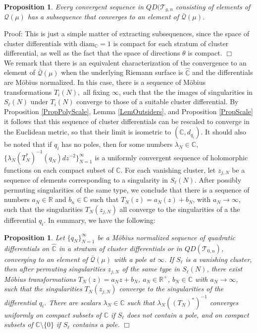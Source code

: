 \documentclass[12pt]{article}
\newtheorem{proposition}[theorem]{Proposition}
\newcommand{\rr}{\mathbb{R}}
\newcommand{\cc}{\mathbb{C}}
\newcommand{\diam}{\mathrm{diam}}
\begin{document}
\begin{proposition} Every convergent sequence in $QD(\mathcal{T}_{g,n}$ consisting of elements of $\mathcal{Q}(\mu)$ has a subsequence that converges to an element of $\bar{\mathcal{Q}}(\mu)$.\end{proposition}

\noindent Proof: This is just a simple matter of extracting subsequences, since the space of cluster differentials with $\diam_\cc = 1$ is compact for each stratum of cluster differential, as well as the fact that the space of directions $\theta$ is compact. $\Box$\\

\noindent We remark that there is an equivalent characterization of the convergence to an element of $\bar{\mathcal{Q}}(\mu)$ when the underlying Riemann surface is $\hat{\cc}$ and the differentials are M\"obius normalized. In this case, there is a sequence of M\"obius transformations $T_i(N),$ all fixing $\infty$, such that the the images of singularities in $S_\ell(N)$ under $T_i(N)$ converge to those of a suitable cluster differential. By Proposition \ref{PropPolyScale}, Lemma \ref{LemOutsiders}, and Proposition \ref{PropScale} it follows that this sequence of cluster differentials can be rescaled to converge in the Euclidean metric, so that their limit is isometric to $(\cc,d_{q_i})$. It should also be noted that if $q_i$ has no poles, then for some numbers $\lambda_N \in \cc,$ $\{\lambda_N (T_N^*)^{-1}(q_N) dz^{-2}\}_{N = 1}^\infty$ is a uniformly convergent sequence of holomorphic functions on each compact subset of $\cc$. For each vanishing cluster, let $z_{j,N}$ be a sequence of elements corresponding to a singularity in $S_\ell(N)$. After possibly permuting singularities of the same type, we conclude that there is a sequence of numbers $a_N \in \rr$ and $b_n \in \cc$ such that $T_N(z) = a_N(z) + b_N$, with $a_N \to \infty$, such that the singularities $T_N(z_{j,N})$ all converge to the singularities of a the differential $q_i$. In summary, we have the following:

\begin{proposition}\label{PropMobiusClusters}Let $\{q_N\}_{N = 1}^\infty$ be a M\"obius normalized sequence of quadratic differentials on $\hat{\cc}$ in a stratum of cluster differentials or in $QD(\mathcal{T}_{0,n})$, converging to an element of $\bar{\mathcal{Q}}(\mu)$ with a pole at $\infty$. If $S_\ell$ is a vanishing cluster, then after permuting singularities $z_{j,N}$ of the same type in $S_\ell(N)$, there exist M\"obius transformations $T_N(z) = a_N z + b_N$, $a_N \in \rr^+$, $b_N \in \cc$ with $a_N \to \infty$, such that the singularities $T_N(z_{j,N})$ converge to the singularities of the differential $q_i$. There are scalars $\lambda_N \in \cc$ such that $\lambda_N ((T_N)^*)^{-1}$ converges uniformly on compact subsets of $\cc$ if $S_\ell$ does not contain a pole, and on compact subsets of $\cc \setminus \{0\}$ if $S_\ell$ contains a pole. $\Box$\end{proposition}
\end{document}
